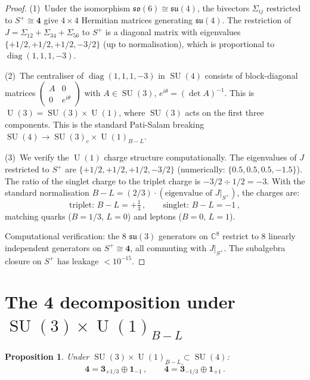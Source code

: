 \documentclass[12pt,a4paper]{article}
\newtheorem{proposition}[theorem]{Proposition}
\theoremstyle{definition}
\newcommand{\SU}{\operatorname{SU}}
\newcommand{\U}{\operatorname{U}}
\newcommand{\diag}{\operatorname{diag}}
\newcommand{\C}{\mathbb{C}}
\begin{document}
\begin{proof}
(1)~Under the isomorphism $\mathfrak{so}(6) \cong \mathfrak{su}(4)$, the bivectors $\Sigma_{ij}$ restricted to $S^+ \cong \mathbf{4}$ give $4 \times 4$ Hermitian matrices generating $\mathfrak{su}(4)$.
The restriction of $J = \Sigma_{12} + \Sigma_{34} + \Sigma_{56}$ to $S^+$ is a diagonal matrix with eigenvalues $\{+1/2, +1/2, +1/2, -3/2\}$ (up to normalisation), which is proportional to $\diag(1,1,1,-3)$.

(2)~The centraliser of $\diag(1,1,1,-3)$ in $\SU(4)$ consists of block-diagonal matrices $\left(\begin{smallmatrix} A & 0 \\ 0 & e^{i\theta} \end{smallmatrix}\right)$ with $A \in \SU(3)$, $e^{i\theta} = (\det A)^{-1}$.
This is $\U(3) = \SU(3) \times \U(1)$, where $\SU(3)$ acts on the first three components.
This is the standard Pati-Salam breaking $\SU(4) \to \SU(3)_c \times \U(1)_{B-L}$.

(3)~We verify the $\U(1)$ charge structure computationally.
The eigenvalues of $J$ restricted to $S^+$ are $\{+1/2, +1/2, +1/2, -3/2\}$ (numerically: $\{0.5, 0.5, 0.5, -1.5\}$).
The ratio of the singlet charge to the triplet charge is $-3/2 \div 1/2 = -3$.
With the standard normalisation $B{-}L = (2/3)\cdot(\text{eigenvalue of } J|_{S^+})$, the charges are:
\begin{equation}
\text{triplet: } B{-}L = +\tfrac{1}{3}\,, \qquad \text{singlet: } B{-}L = -1\,,
\end{equation}
matching quarks ($B = 1/3$, $L = 0$) and leptons ($B = 0$, $L = 1$).

Computational verification: the 8 $\mathfrak{su}(3)$ generators on $\C^8$ restrict to 8 linearly independent generators on $S^+ \cong \mathbf{4}$, all commuting with $J|_{S^+}$.
The subalgebra closure on $S^+$ has leakage $< 10^{-15}$.
\end{proof}


\section{The \texorpdfstring{$\mathbf{4}$}{4} decomposition under \texorpdfstring{$\SU(3) \times \U(1)_{B-L}$}{SU(3)xU(1)}}
\label{sec:decomposition}

\begin{proposition}
Under $\SU(3) \times \U(1)_{B-L} \subset \SU(4)$:
\begin{equation}
\mathbf{4} = \mathbf{3}_{+1/3} \oplus \mathbf{1}_{-1}\,, \qquad \bar{\mathbf{4}} = \bar{\mathbf{3}}_{-1/3} \oplus \mathbf{1}_{+1}\,.
\end{equation}
\end{proposition}
\end{document}
